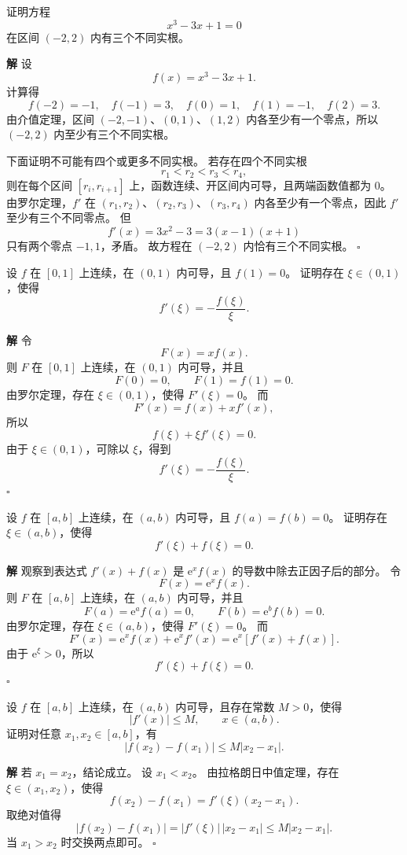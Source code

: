 \documentclass[fontset=fandol]{ctexart}
\newenvironment{solution}{\par\noindent\textbf{解}\quad}{\hfill$\square$\par\vspace{0.8em}}
\newcommand{\ee}{\mathrm{e}}
\begin{document}
\begin{example}[罗尔定理证明方程根的个数]
证明方程
\[
x^3-3x+1=0
\]
在区间 $(-2,2)$ 内有三个不同实根。
\end{example}
\begin{solution}
设
\[
f(x)=x^3-3x+1.
\]
计算得
\[
f(-2)=-1,\quad f(-1)=3,\quad f(0)=1,\quad f(1)=-1,\quad f(2)=3.
\]
由介值定理，区间 $(-2,-1)$、$(0,1)$、$(1,2)$ 内各至少有一个零点，所以 $(-2,2)$ 内至少有三个不同实根。

下面证明不可能有四个或更多不同实根。 若存在四个不同实根
\[
r_1<r_2<r_3<r_4,
\]
则在每个区间 $[r_i,r_{i+1}]$ 上，函数连续、开区间内可导，且两端函数值都为 $0$。 由罗尔定理，$f'$ 在 $(r_1,r_2)$、$(r_2,r_3)$、$(r_3,r_4)$ 内各至少有一个零点，因此 $f'$ 至少有三个不同零点。 但
\[
f'(x)=3x^2-3=3(x-1)(x+1)
\]
只有两个零点 $-1,1$，矛盾。 故方程在 $(-2,2)$ 内恰有三个不同实根。
\end{solution}

\begin{example}[构造辅助函数]
设 $f$ 在 $[0,1]$ 上连续，在 $(0,1)$ 内可导，且 $f(1)=0$。 证明存在 $\xi\in(0,1)$，使得
\[
f'(\xi)=-\frac{f(\xi)}{\xi}.
\]
\end{example}
\begin{solution}
令
\[
F(x)=xf(x).
\]
则 $F$ 在 $[0,1]$ 上连续，在 $(0,1)$ 内可导，并且
\[
F(0)=0,\qquad F(1)=f(1)=0.
\]
由罗尔定理，存在 $\xi\in(0,1)$，使得 $F'(\xi)=0$。 而
\[
F'(x)=f(x)+xf'(x),
\]
所以
\[
f(\xi)+\xi f'(\xi)=0.
\]
由于 $\xi\in(0,1)$，可除以 $\xi$，得到
\[
f'(\xi)=-\frac{f(\xi)}{\xi}.
\]
\end{solution}

\begin{example}[构造辅助函数]
设 $f$ 在 $[a,b]$ 上连续，在 $(a,b)$ 内可导，且 $f(a)=f(b)=0$。 证明存在 $\xi\in(a,b)$，使得
\[
f'(\xi)+f(\xi)=0.
\]
\end{example}
\begin{solution}
观察到表达式 $f'(x)+f(x)$ 是 $\ee^x f(x)$ 的导数中除去正因子后的部分。 令
\[
F(x)=\ee^x f(x).
\]
则 $F$ 在 $[a,b]$ 上连续，在 $(a,b)$ 内可导，并且
\[
F(a)=\ee^a f(a)=0,\qquad F(b)=\ee^b f(b)=0.
\]
由罗尔定理，存在 $\xi\in(a,b)$，使得 $F'(\xi)=0$。 而
\[
F'(x)=\ee^x f(x)+\ee^x f'(x)=\ee^x[f'(x)+f(x)].
\]
由于 $\ee^\xi>0$，所以
\[
f'(\xi)+f(\xi)=0.
\]
\end{solution}

\begin{example}[由导数界估计函数增量]
设 $f$ 在 $[a,b]$ 上连续，在 $(a,b)$ 内可导，且存在常数 $M>0$，使得
\[
|f'(x)|\leq M,\qquad x\in(a,b).
\]
证明对任意 $x_1,x_2\in[a,b]$，有
\[
|f(x_2)-f(x_1)|\leq M|x_2-x_1|.
\]
\end{example}
\begin{solution}
若 $x_1=x_2$，结论成立。 设 $x_1<x_2$。 由拉格朗日中值定理，存在 $\xi\in(x_1,x_2)$，使得
\[
f(x_2)-f(x_1)=f'(\xi)(x_2-x_1).
\]
取绝对值得
\[
|f(x_2)-f(x_1)|=|f'(\xi)|\,|x_2-x_1|\leq M|x_2-x_1|.
\]
当 $x_1>x_2$ 时交换两点即可。
\end{solution}
\end{document}
